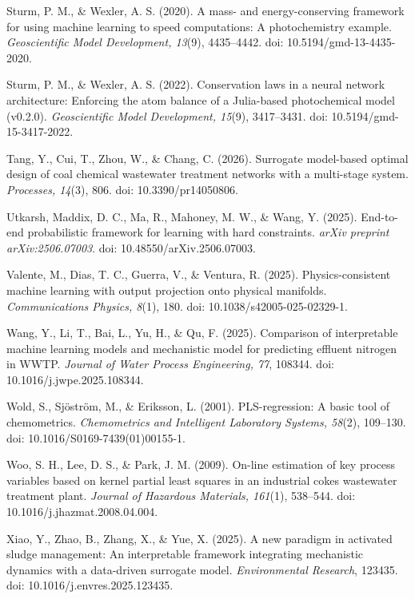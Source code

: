 \documentclass[a4paper,fleqn]{cas-sc}
\begin{document}
\noindent Sturm, P. M., \& Wexler, A. S. (2020). A mass- and energy-conserving framework for using machine learning to speed computations: A photochemistry example. \textit{Geoscientific Model Development, 13}(9), 4435--4442. doi: 10.5194/gmd-13-4435-2020.

\noindent Sturm, P. M., \& Wexler, A. S. (2022). Conservation laws in a neural network architecture: Enforcing the atom balance of a Julia-based photochemical model (v0.2.0). \textit{Geoscientific Model Development, 15}(9), 3417--3431. doi: 10.5194/gmd-15-3417-2022.

\noindent Tang, Y., Cui, T., Zhou, W., \& Chang, C. (2026). Surrogate model-based optimal design of coal chemical wastewater treatment networks with a multi-stage system. \textit{Processes, 14}(3), 806. doi: 10.3390/pr14050806.

\noindent Utkarsh, Maddix, D. C., Ma, R., Mahoney, M. W., \& Wang, Y. (2025). End-to-end probabilistic framework for learning with hard constraints. \textit{arXiv preprint arXiv:2506.07003}. doi: 10.48550/arXiv.2506.07003.

\noindent Valente, M., Dias, T. C., Guerra, V., \& Ventura, R. (2025). Physics-consistent machine learning with output projection onto physical manifolds. \textit{Communications Physics, 8}(1), 180. doi: 10.1038/s42005-025-02329-1.

\noindent Wang, Y., Li, T., Bai, L., Yu, H., \& Qu, F. (2025). Comparison of interpretable machine learning models and mechanistic model for predicting effluent nitrogen in WWTP. \textit{Journal of Water Process Engineering, 77}, 108344. doi: 10.1016/j.jwpe.2025.108344.

\noindent Wold, S., Sj\"ostr\"om, M., \& Eriksson, L. (2001). PLS-regression: A basic tool of chemometrics. \textit{Chemometrics and Intelligent Laboratory Systems, 58}(2), 109--130. doi: 10.1016/S0169-7439(01)00155-1.

\noindent Woo, S. H., Lee, D. S., \& Park, J. M. (2009). On-line estimation of key process variables based on kernel partial least squares in an industrial cokes wastewater treatment plant. \textit{Journal of Hazardous Materials, 161}(1), 538--544. doi: 10.1016/j.jhazmat.2008.04.004.

\noindent Xiao, Y., Zhao, B., Zhang, X., \& Yue, X. (2025). A new paradigm in activated sludge management: An interpretable framework integrating mechanistic dynamics with a data-driven surrogate model. \textit{Environmental Research}, 123435. doi: 10.1016/j.envres.2025.123435.
\end{document}
